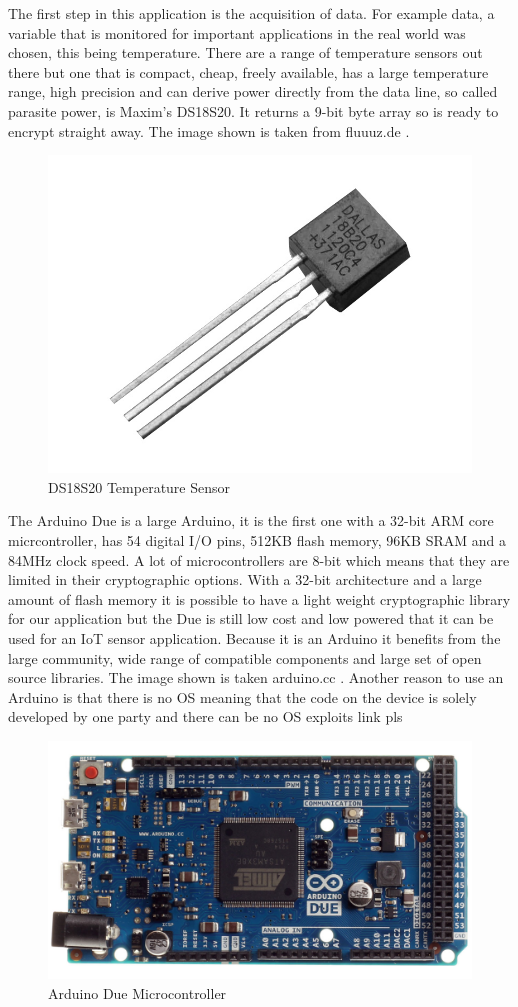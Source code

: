 The first step in this application is the acquisition of data. For example data, a variable that is monitored for important applications in the real world was chosen, this being temperature. There are a range of temperature sensors out there but one that is compact, cheap, freely available, has a large temperature range, high precision and can derive power directly from the data line, so called parasite power, is Maxim's DS18S20. It returns a 9-bit byte array so is ready to encrypt straight away. The image shown is taken from fluuuz.de \cite{dsimage}.

\begin{figure}[H]
	\centering
	\includegraphics[width=.4\linewidth]{Figures/ds.jpg}
	\caption{DS18S20 Temperature Sensor}
	\label{fig:ds}
\end{figure}

The Arduino Due is a large Arduino, it is the first one with a 32-bit ARM core micrcontroller, has 54 digital I/O pins, 512KB flash memory, 96KB SRAM and a 84MHz clock speed. A lot of microcontrollers are 8-bit which means that they are limited in their cryptographic options. With a 32-bit architecture and a large amount of flash memory it is possible to have a light weight cryptographic library for our application but the Due is still low cost and low powered that it can be used for an IoT sensor application. Because it is an Arduino it benefits from the large community, wide range of compatible components and large set of open source libraries. The image shown is taken arduino.cc \cite{dueimage}. Another reason to use an Arduino is that there is no OS meaning that the code on the device is solely developed by one party and there can be no OS exploits link pls

\begin{figure}[H]
	\centering
	\includegraphics[width=.4\linewidth]{Figures/due.jpg}
	\caption{Arduino Due Microcontroller}
	\label{fig:due}
\end{figure}

